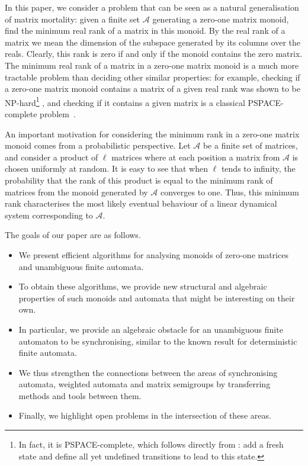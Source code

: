 \documentclass[11pt,a4paper]{amsart}
\newcommand{\Aa}{\mathcal{A}}
\newcommand{\NP}{\textnormal{\textsf{NP}}\xspace}
\newcommand{\PSPACE}{\textnormal{\textsf{PSPACE}}\xspace}
\theoremstyle{plain}
\theoremstyle{definition}
\theoremstyle{defC}
\theoremstyle{thmC}
\theoremstyle{plain}
\numberwithin{equation}{section}
\begin{document}
In this paper, we consider a problem that can be seen as a natural generalisation of matrix mortality: given a finite set $\Aa$ generating a zero-one matrix monoid, find the minimum real rank of a matrix in this monoid. By the real rank of a matrix we mean the dimension of the subspace generated by its columns over the reals. Clearly, this rank is zero if and only if the monoid contains the zero matrix. 
The minimum real rank of a matrix in a zero-one matrix monoid is a much more tractable problem than deciding other similar properties: for example,  checking if a zero-one matrix monoid contains a matrix of a given real rank was shown to be \NP-hard\footnote{In fact, it is \PSPACE-complete, which follows directly from \cite[Theorem~3]{Berlinkov2014}: add a fresh state and define all yet undefined transitions to lead to this state.} \cite{GORALCIK1995}, and checking if it contains a given matrix is a classical \PSPACE-complete problem~\cite{Kozen1977}.

An important motivation for considering the minimum rank in a zero-one matrix monoid comes from a probabilistic perspective. Let $\Aa$ be a finite set of matrices, and consider a product of $\ell$ matrices where at each position a matrix from $\Aa$ is chosen uniformly at random. It is easy to see that when $\ell$ tends to infinity, the probability that the rank of this product is equal to the minimum rank of matrices from the monoid generated by $\Aa$ converges to one. Thus, this minimum rank characterises the most likely eventual behaviour of a linear dynamical system corresponding to $\Aa$.

The goals of our paper are as follows.
\begin{itemize}
    \item We present efficient algorithms for analysing monoids of zero-one matrices and unambiguous finite automata.

    \item To obtain these algorithms, we provide new structural and algebraic properties of such monoids and automata that might be interesting on their own.

    \item In particular, we provide an algebraic obstacle for an unambiguous finite automaton to be synchronising, similar to the known result for deterministic finite automata. 

    \item We thus strengthen the connections between the areas of synchronising automata, weighted automata and matrix semigroups by transferring methods and tools between them.

    \item Finally, we highlight open problems in the intersection of these areas.
\end{itemize}
\end{document}
